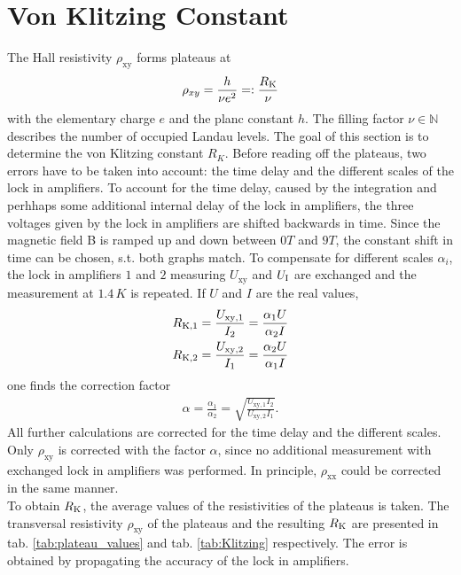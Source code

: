 \section{Von Klitzing Constant}

The Hall resistivity $\rho_{\text{xy}}$ forms plateaus at
\begin{align}
    \rho_{xy} = \frac{h}{\nu e^2} =: \frac{R_\text K}{\nu}
\end{align}
with the elementary charge $e$ and the planc constant $h$. 
The filling factor $\nu \in \mathbb N$ describes the number of occupied Landau levels.
The goal of this section is to determine the von Klitzing constant $R_K$.
Before reading off the plateaus, two errors have to be taken into account:
the time delay and the different scales of the lock in amplifiers.
To account for the time delay, 
caused by the integration and perhhaps some additional internal delay of the lock in amplifiers,
the three voltages given by the lock in amplifiers are shifted backwards in time.
Since the magnetic field B is ramped up and down between $0T$ and $9T$, 
the constant shift in time can be chosen, s.t. both graphs match.
To compensate for different scales $\alpha_i$, 
the lock in amplifiers $1$ and $2$ measuring $U_\text{xy}$ and $U_\text I$ are exchanged and the measurement at $1.4\,K$ is repeated.
If $U$ and $I$ are the real values,
\begin{align}
    R_{\text K,1} = \frac{U_{\text{xy}, 1}}{I_2} = \frac{\alpha_1 U}{\alpha_2 I}\\
    R_{\text K,2} = \frac{U_{\text{xy}, 2}}{I_1} = \frac{\alpha_2 U}{\alpha_1 I}
\end{align}
one finds the correction factor
\begin{align}
    \alpha = \frac{\alpha_1}{\alpha_2} = \sqrt{\frac{U_{\text{xy},1}I_2}{U_{\text{xy}, 2}I_1}}. 
\end{align}
All further calculations are corrected for the time delay and the different scales.
Only $\rho_{\text{xy}}$ is corrected with the factor $\alpha$, 
since no additional measurement with exchanged lock in amplifiers was performed.
In principle, $\rho_{\text{xx}}$ could be corrected in the same manner.
\\
To obtain $R_\text K$, the average values of the resistivities of the plateaus is taken.
The transversal resistivity $\rho_{\text{xy}}$ of the plateaus and the resulting $R_\text K$ are presented in 
tab. \ref{tab:plateau_values} and tab. \ref{tab:Klitzing} respectively.
The error is obtained by propagating the accuracy of the lock in amplifiers.
